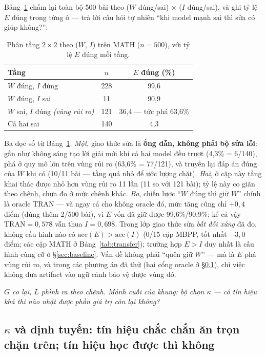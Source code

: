 \documentclass[11pt,a4paper]{article}
\newcommand{\CEIL}{\mathrm{TRAN}}
\newcommand{\acc}{\mathrm{acc}}
\begin{document}
Bảng~\ref{tab:222} chấm lại toàn bộ 500 bài theo ($W$ đúng/sai) $\times$ ($I$ đúng/sai), và ghi
tỷ lệ $E$ đúng trong từng ô --- trả lời câu hỏi tự nhiên ``khi model mạnh sai thì sửa có giúp
không?'':

\begin{table}[t]\centering\small
\begin{tabular}{lcc}\toprule
Tầng & $n$ & $E$ đúng (\%)\\\midrule
$W$ đúng, $I$ đúng & 228 & 99,6\\
$W$ đúng, $I$ sai & 11 & 90,9\\
$W$ sai, $I$ đúng \emph{(vùng rủi ro)} & 121 & 36,4 --- tức phá 63,6\%\\
Cả hai sai & 140 & 4,3\\\bottomrule
\end{tabular}
\caption{Phân tầng $2\times 2$ theo ($W$, $I$) trên MATH ($n=500$), với tỷ lệ $E$ đúng mỗi tầng.}
\label{tab:222}
\end{table}

Ba đọc số từ Bảng~\ref{tab:222}. \emph{Một}, giao thức sửa là \textbf{ống dẫn, không phải bộ
sửa lỗi}: gần như không sáng tạo lời giải mới khi cả hai model đều trượt (4,3\% = 6/140), phá ở
quy mô lớn trên vùng rủi ro (63,6\% = 77/121), và truyền lại đáp án đúng của $W$ khi có (10/11
bài --- tầng quá nhỏ để ước lượng chặt). \emph{Hai}, ở cặp này tầng khai thác được nhỏ hơn vùng
rủi ro 11 lần (11 so với 121 bài); tỷ lệ này co giãn theo chênh, chưa đo ở mức chênh khác.
\emph{Ba}, chiến lược ``$W$ đúng thì giữ $W$'' chính là oracle $\CEIL$ --- và ngay cả cho không
oracle đó, mức tăng cũng chỉ $+0{,}4$ điểm (đúng thêm 2/500 bài), vì $E$ vốn đã giữ được
99,6\%/90,9\%; kể cả vậy $\CEIL = 0{,}578$ vẫn thua $I = 0{,}698$. Trong lớp giao thức sửa
\emph{bất đối xứng} đã đo, không cấu hình nào có $\acc(E) > \acc(I)$ (0/15 cặp MBPP, tốt nhất
$-3{,}0$ điểm; các cặp MATH ở Bảng~\ref{tab:transfer}); trường hợp $E>I$ duy nhất là cấu hình
cùng cỡ ở \S\ref{sec:baseline}. Vấn đề không phải ``quên giữ $W$'' --- mà là $E$ phá vùng rủi
ro, và trong các phương án đã thử (hai cổng oracle ở \S\ref{sec:kappa}), chỉ việc không đưa
artifact vào ngữ cảnh bảo vệ được vùng đó.

\emph{$G$ co lại, $L$ phình ra theo chênh. Mảnh cuối của khung: bộ chọn $\kappa$ --- có tín
hiệu khả thi nào nhặt được phần giá trị còn lại không?}

\subsection{$\kappa$ và định tuyến: tín hiệu chắc chắn ăn trọn chặn trên; tín hiệu học được thì không}\label{sec:kappa}
\end{document}
